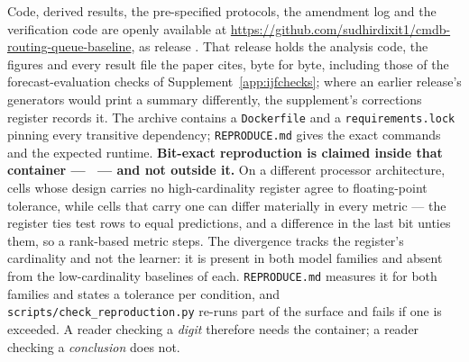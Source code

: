 Code, derived results, the pre-specified protocols, the amendment log and the
verification code are openly available at
\url{https://github.com/sudhirdixit1/cmdb-routing-queue-baseline}, as release
\releaseTag. That release holds the analysis code, the figures and every
result file the paper cites, byte for byte, including those of the
forecast-evaluation checks of Supplement~\ref{app:ijfchecks}; where an
earlier release's generators would print a summary differently, the
supplement's corrections register records it.
The archive contains a \texttt{Dockerfile} and a \texttt{requirements.lock}
pinning every transitive dependency; \texttt{REPRODUCE.md} gives the exact
commands and the expected runtime. \textbf{Bit-exact reproduction is claimed
inside that container --- \imageDigest\ --- and not outside it.} On a different processor architecture, cells whose design carries no
high-cardinality register agree to floating-point tolerance, while cells that
carry one can differ materially in every metric --- the register ties test
rows to equal predictions, and a difference in the last bit unties them, so a
rank-based metric steps. The divergence tracks the register's cardinality and
not the learner: it is present in both model families and absent from the
low-cardinality baselines of each. \texttt{REPRODUCE.md} measures it for both
families and states a tolerance per condition, and
\texttt{scripts/check\_reproduction.py} re-runs part of the surface and fails
if one is exceeded. A reader checking a \emph{digit} therefore needs the
container; a reader checking a \emph{conclusion} does not.

